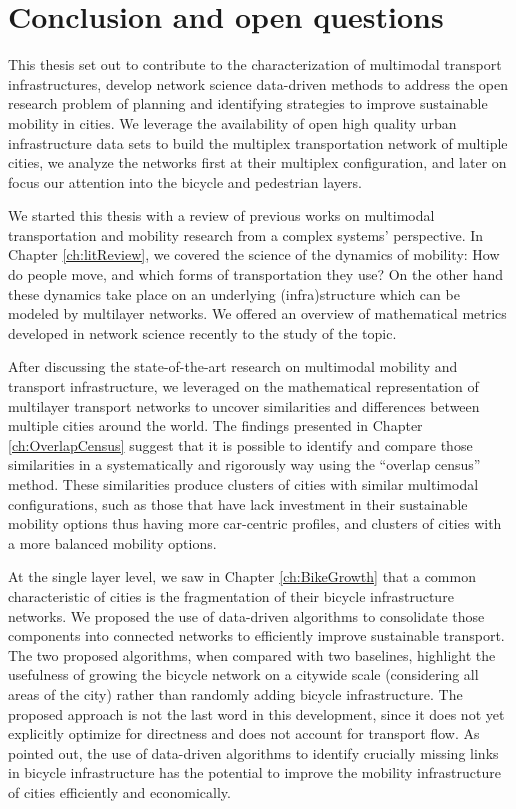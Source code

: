 \chapter{Conclusion and open questions}\label{ch:Conclusion}

This thesis set out to contribute to the characterization of multimodal transport infrastructures, develop network science data-driven methods to address the open research problem of planning and identifying strategies to improve sustainable mobility in cities. We leverage the availability of open high quality urban infrastructure data sets to build the multiplex transportation network of multiple cities, we analyze the networks first at their multiplex configuration, and later on focus our attention into the bicycle and pedestrian layers.

We started this thesis with a review of previous works on multimodal transportation and mobility research from a complex systems' perspective. In Chapter \ref{ch:litReview}, we covered the science of the dynamics of mobility: How do people move, and which forms of transportation they use? On the other hand these dynamics take place on an underlying (infra)structure which can be modeled by multilayer networks. We offered an overview of mathematical metrics developed in network science recently to the study of the topic. 

After discussing the state-of-the-art research on multimodal mobility and transport infrastructure, we leveraged on the mathematical representation of multilayer transport networks to uncover similarities and differences between multiple cities around the world. The findings presented in Chapter \ref{ch:OverlapCensus} suggest that it is possible to identify and compare those similarities in a systematically and rigorously way using the ``overlap census'' method. These similarities produce clusters of cities with similar multimodal configurations, such as those that have lack investment in their sustainable mobility options thus having more car-centric profiles, and clusters of cities with a more balanced mobility options.

At the single layer level, we saw in Chapter \ref{ch:BikeGrowth} that a common characteristic of cities is the fragmentation of their bicycle infrastructure networks. We proposed the use of data-driven algorithms to consolidate those components into connected networks to efficiently improve sustainable transport. The two proposed algorithms, when compared with two baselines, highlight the usefulness of growing the bicycle network on a citywide scale (considering all areas of the city) rather than randomly adding bicycle infrastructure. The proposed approach is not the last word in this development, since it does not yet explicitly optimize for directness and does not account for transport flow. As pointed out, the use of data-driven algorithms to identify crucially missing links in bicycle infrastructure has the potential to improve the mobility infrastructure of cities efficiently and economically.

